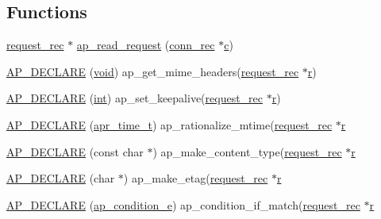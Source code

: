 \subsection*{Functions}
\begin{DoxyCompactItemize}
\item 
\hyperlink{structrequest__rec}{request\+\_\+rec} $\ast$ \hyperlink{group__APACHE__CORE__PROTO_gac0e6bdb5b96c1a7e3a7957576dee312b}{ap\+\_\+read\+\_\+request} (\hyperlink{structconn__rec}{conn\+\_\+rec} $\ast$\hyperlink{pcregrep_8txt_aef720ae5f62fa015619d00171d917416}{c})
\item 
\hyperlink{group__APACHE__CORE__PROTO_gadcd9668318a93e6285c7e8b00d4a150f}{A\+P\+\_\+\+D\+E\+C\+L\+A\+RE} (\hyperlink{group__MOD__ISAPI_gacd6cdbf73df3d9eed42fa493d9b621a6}{void}) ap\+\_\+get\+\_\+mime\+\_\+headers(\hyperlink{structrequest__rec}{request\+\_\+rec} $\ast$\hyperlink{pcregrep_8txt_a2e9e9438b26c0bb4425367a7e4f75eb3}{r})
\item 
\hyperlink{group__APACHE__CORE__PROTO_ga79d3c244357d43510706a32d493c7640}{A\+P\+\_\+\+D\+E\+C\+L\+A\+RE} (\hyperlink{pcre_8txt_a42dfa4ff673c82d8efe7144098fbc198}{int}) ap\+\_\+set\+\_\+keepalive(\hyperlink{structrequest__rec}{request\+\_\+rec} $\ast$\hyperlink{pcregrep_8txt_a2e9e9438b26c0bb4425367a7e4f75eb3}{r})
\item 
\hyperlink{group__APACHE__CORE__PROTO_ga87fb7f51679c806c557542975df44ddc}{A\+P\+\_\+\+D\+E\+C\+L\+A\+RE} (\hyperlink{group__apr__time_gadb4bde16055748190eae190c55aa02bb}{apr\+\_\+time\+\_\+t}) ap\+\_\+rationalize\+\_\+mtime(\hyperlink{structrequest__rec}{request\+\_\+rec} $\ast$\hyperlink{pcregrep_8txt_a2e9e9438b26c0bb4425367a7e4f75eb3}{r}
\item 
\hyperlink{group__APACHE__CORE__PROTO_ga797241525d691947413a10e2522a4212}{A\+P\+\_\+\+D\+E\+C\+L\+A\+RE} (const char $\ast$) ap\+\_\+make\+\_\+content\+\_\+type(\hyperlink{structrequest__rec}{request\+\_\+rec} $\ast$\hyperlink{pcregrep_8txt_a2e9e9438b26c0bb4425367a7e4f75eb3}{r}
\item 
\hyperlink{group__APACHE__CORE__PROTO_ga0f01505639e103e822e650351daa86b7}{A\+P\+\_\+\+D\+E\+C\+L\+A\+RE} (char $\ast$) ap\+\_\+make\+\_\+etag(\hyperlink{structrequest__rec}{request\+\_\+rec} $\ast$\hyperlink{pcregrep_8txt_a2e9e9438b26c0bb4425367a7e4f75eb3}{r}
\item 
\hyperlink{group__APACHE__CORE__PROTO_ga38a67300f881ecfcc3d842d2ce8e2162}{A\+P\+\_\+\+D\+E\+C\+L\+A\+RE} (\hyperlink{group__APACHE__CORE__PROTO_ga0c22f044612f116fb81886e73bbce80b}{ap\+\_\+condition\+\_\+e}) ap\+\_\+condition\+\_\+if\+\_\+match(\hyperlink{structrequest__rec}{request\+\_\+rec} $\ast$\hyperlink{pcregrep_8txt_a2e9e9438b26c0bb4425367a7e4f75eb3}{r}

\end{DoxyCompactItemize}
